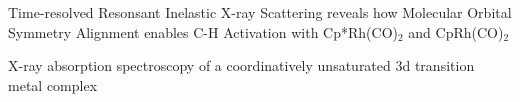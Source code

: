 \documentclass{UUThesisTemplate}
\begin{document}
\frontmatter
    \frontmatterCS 
 
   \dedication{To Mama and Papa}
 
    \begin{listofpapers}
    	\item Time-resolved Resonsant Inelastic X-ray Scattering reveals how Molecular Orbital Symmetry Alignment enables C-H Activation with Cp*Rh(CO)$_{2}$ and CpRh(CO)$_{2}$ 
        \item X-ray absorption spectroscopy of a coordinatively unsaturated 3d transition metal complex
    \label{apaperlabel}
    \end{listofpapers}
    
    
    \begingroup
        \tableofcontents
    \endgroup
    

\mainmatter
    
    
    
    
    
    
    


\backmatter
    \nocite{*} %
    
    
\end{document}

